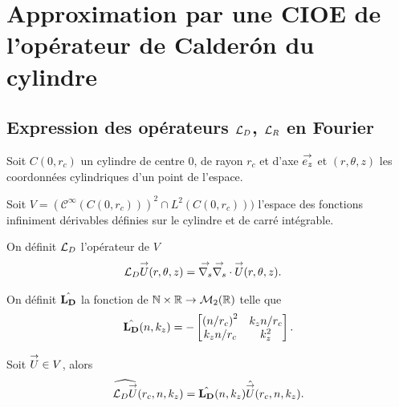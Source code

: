 \section{Approximation par une CIOE de l'opérateur de Calderón du cylindre}

  \subsection[Expression des opérateurs LD, LR en Fourier]{Expression des opérateurs \({\mathcal{L}_D}\), \({\mathcal{L}_R}\) en Fourier}
    Soit \(C(0,r_c)\) un cylindre de centre 0, de rayon \(r_c\) et d'axe \({\overset{\rightarrow}{e_z}}\) et \((r,\theta,z)\) les coordonnées cylindriques d'un point de l'espace.

    Soit \(V = \left(\mathcal{C}^\infty(C(0,r_c))\right)^2 \cap L^2(C(0,r_c)))\) l'espace des fonctions infiniment dérivables définies sur le cylindre et de carré intégrable.

    \begin{defn}
      \label{eq:cylindre:fourier:LD}
      On définit \({\mathcal{L}_D}\) l'opérateur de \(V\)
      \begin{align*}
        {\mathcal{L}_D} {\overset{\rightarrow}{U}}(r,\theta,z) & = {\overset{\rightarrow}{\nabla_s}}{} {\overset{\rightarrow}{\nabla_s}} \cdot{} {\overset{\rightarrow}{U}}(r,\theta,z).
      \end{align*}

      On définit \(\hat{\mathbf{L_D}}\) la fonction de \(\mathbb N\times\mathbb R \rightarrow \mathcal{M}_2(\mathbb R)\) telle que
      \begin{equation*}
        \hat{\mathbf{L_D}}(n,k_z) = -
        \begin{bmatrix}
          \left({n}\slash{r_c}\right)^2 & k_z{n}\slash{r_c}
          \\
          k_z{n}\slash{r_c} & k_z^2
        \end{bmatrix}.
      \end{equation*}
    \end{defn}

    \begin{prop}
      Soit \({\overset{\rightarrow}{U}} \in V\), alors
      \begin{equation*}
        \widehat{{\mathcal{L}_D} {\overset{\rightarrow}{U}}} (r_c,n,k_z) = \hat{\mathbf{L_D}}(n,k_z) \hat{{\overset{\rightarrow}{U}}}(r_c,n,k_z).
      \end{equation*}
    \end{prop}

